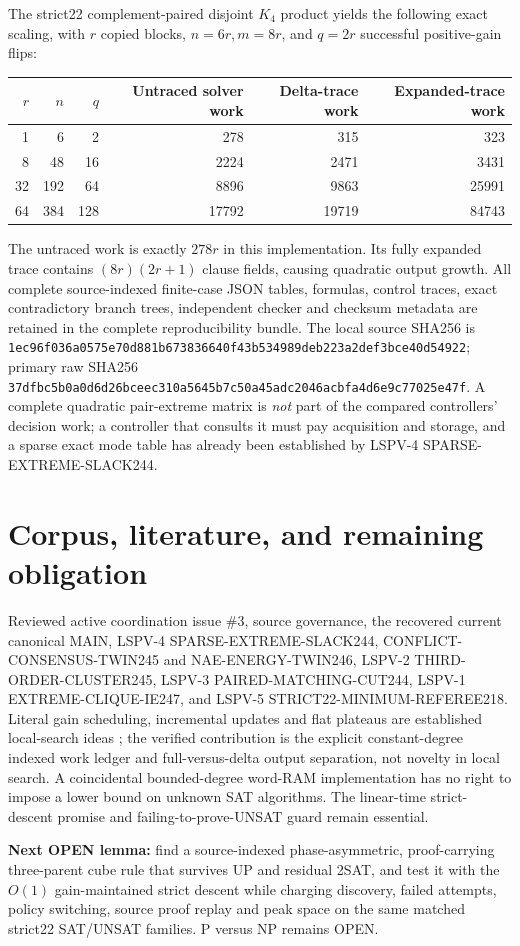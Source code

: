 \documentclass[10pt]{article}
\begin{document}
The strict22 complement-paired disjoint $K_4$ product yields the following exact scaling, with $r$ copied blocks, $n=6r,m=8r$, and $q=2r$ successful positive-gain flips:
\begin{center}\small\begin{tabular}{rrrrrr}
\toprule $r$&$n$&$q$&Untraced solver work&Delta-trace work&Expanded-trace work\\\midrule
1&6&2&278&315&323\\
8&48&16&2224&2471&3431\\
32&192&64&8896&9863&25991\\
64&384&128&17792&19719&84743\\\bottomrule
\end{tabular}\end{center}
The untraced work is exactly $278r$ in this implementation. Its fully expanded trace contains $(8r)(2r+1)$ clause fields, causing quadratic output growth. All complete source-indexed finite-case JSON tables, formulas, control traces, exact contradictory branch trees, independent checker and checksum metadata are retained in the complete reproducibility bundle. The local source SHA256 is \texttt{1ec96f036a0575e70d881b673836640f43b534989deb223a2def3bce40d54922}; primary raw SHA256 \texttt{37dfbc5b0a0d6d26bceec310a5645b7c50a45adc2046acbfa4d6e9c77025e47f}. A complete quadratic pair-extreme matrix is \emph{not} part of the compared controllers' decision work; a controller that consults it must pay acquisition and storage, and a sparse exact mode table has already been established by LSPV-4 SPARSE-EXTREME-SLACK244.

\section*{Corpus, literature, and remaining obligation}
Reviewed active coordination issue \#3, source governance, the recovered current canonical MAIN, LSPV-4 SPARSE-EXTREME-SLACK244, CONFLICT-CONSENSUS-TWIN245 and NAE-ENERGY-TWIN246, LSPV-2 THIRD-ORDER-CLUSTER245, LSPV-3 PAIRED-MATCHING-CUT244, LSPV-1 EXTREME-CLIQUE-IE247, and LSPV-5 STRICT22-MINIMUM-REFEREE218. Literal gain scheduling, incremental updates and flat plateaus are established local-search ideas \cite{Selman1992,SelmanKautz1993}; the verified contribution is the explicit constant-degree indexed work ledger and full-versus-delta output separation, not novelty in local search. A coincidental bounded-degree word-RAM implementation has no right to impose a lower bound on unknown SAT algorithms. The linear-time strict-descent promise and failing-to-prove-UNSAT guard remain essential.

\noindent\textbf{Next OPEN lemma:} find a source-indexed phase-asymmetric, proof-carrying three-parent cube rule that survives UP and residual 2SAT, and test it with the $O(1)$ gain-maintained strict descent while charging discovery, failed attempts, policy switching, source proof replay and peak space on the same matched strict22 SAT/UNSAT families. P versus NP remains OPEN.

\end{document}
